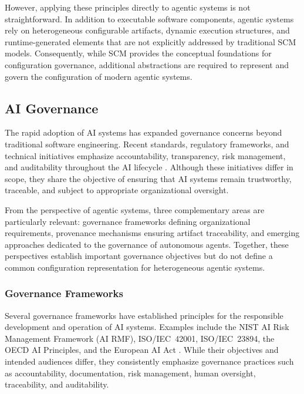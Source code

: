 \documentclass[10pt]{article}
\begin{document}
However, applying these principles directly to agentic systems is not straightforward. In addition to executable software components, agentic systems rely on heterogeneous configurable artifacts, dynamic execution structures, and runtime-generated elements that are not explicitly addressed by traditional SCM models. Consequently, while SCM provides the conceptual foundations for configuration governance, additional abstractions are required to represent and govern the configuration of modern agentic systems.

\subsection{AI Governance}
\label{sec:ai_governance}

The rapid adoption of AI systems has expanded governance concerns beyond traditional software engineering. Recent standards, regulatory frameworks, and technical initiatives emphasize accountability, transparency, risk management, and auditability throughout the AI lifecycle \cite{pandey2025agentic, Engin_Hand_2026, Gangavarapu2025, shavit2023practices, IMDA2026AgenticMGF}. Although these initiatives differ in scope, they share the objective of ensuring that AI systems remain trustworthy, traceable, and subject to appropriate organizational oversight.

From the perspective of agentic systems, three complementary areas are particularly relevant: governance frameworks defining organizational requirements, provenance mechanisms ensuring artifact traceability, and emerging approaches dedicated to the governance of autonomous agents. Together, these perspectives establish important governance objectives but do not define a common configuration representation for heterogeneous agentic systems.

\subsubsection{Governance Frameworks}
\label{sec:governance_frameworks}

Several governance frameworks have established principles for the responsible development and operation of AI systems. Examples include the NIST AI Risk Management Framework (AI RMF), ISO/IEC~42001, ISO/IEC~23894, the OECD AI Principles, and the European AI Act \cite{ai2023artificial, benraouane2024ai, simonetta2024iso, yeung2020recommendation, edwards2021eu}. While their objectives and intended audiences differ, they consistently emphasize governance practices such as accountability, documentation, risk management, human oversight, traceability, and auditability.
\end{document}
